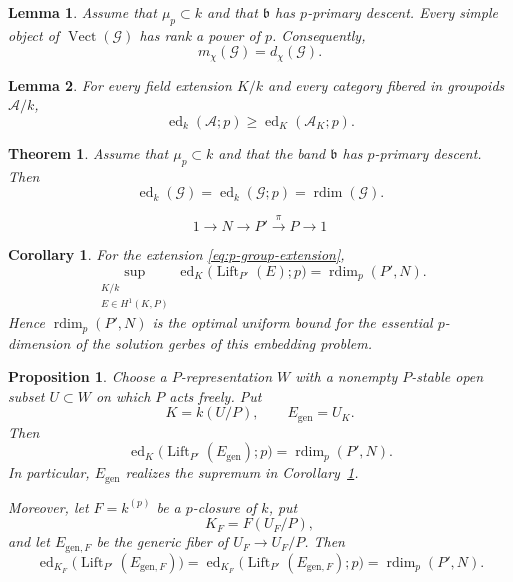 \documentclass[10pt,a4paper]{amsart}
\newtheorem{lemm}{Lemma}
\newtheorem{theo}{Theorem}
\newtheorem{coro}{Corollary}
\newtheorem{prop}{Proposition}
\def\Vect{{\operatorname{Vect}}}
\def\band{{\mathfrak b}}
\def\cA{{\mathcal A}}
\def\cG{{\mathcal G}}
\def\ed{{\operatorname{ed}}}
\def\ra{{\rightarrow}}
\def\rdim{{\operatorname{rdim}}}
\begin{document}
\begin{lemm}\label{lem:p-power-ranks-main}
Assume that $\mu_p\subset k$ and that $\band$ has $p$-primary
descent.  Every simple object of
$\Vect(\cG)$ has rank a power of $p$.  Consequently,
\begin{equation}\label{eq:block-gcd}
m_\chi(\cG)=d_\chi(\cG).
\end{equation}
\end{lemm}

\begin{lemm}\label{lem:ed-base-change}
For every field extension $K/k$ and every category fibered in groupoids
$\cA/k$,
\[
\ed_k(\cA;p)\ge\ed_K(\cA_K;p).
\]
\end{lemm}

\begin{theo}
\label{thm:gerby-km-special}
Assume that $\mu_p\subset k$ and that the band $\band$ has
$p$-primary descent.  Then
\begin{equation}\label{eq:gerby-km-special}
\ed_k(\cG)=\ed_k(\cG;p)=\rdim(\cG).
\end{equation}
\end{theo}

\begin{equation}\label{eq:p-group-extension}
1\ra N\ra P'
\xrightarrow{\pi}P\ra1
\end{equation}

\begin{coro}
\label{cor:embedding-problem}
For the extension \eqref{eq:p-group-extension},
\[
\sup_{\substack{K/k\\E\in H^1(K,P)}}
\ed_K\bigl(\operatorname{Lift}_{P'}(E);p\bigr)
=\rdim_p(P',N).
\]
Hence $\rdim_p(P',N)$ is the optimal uniform bound for the essential
$p$-dimension of the solution gerbes of this embedding problem.
\end{coro}

\begin{prop}
\label{pro:generic-embedding-problem}
Choose a $P$-representation $W$ with a nonempty $P$-stable open subset
$U\subset W$ on which $P$ acts freely.  Put
\[
K=k(U/P),
\qquad
E_{\mathrm{gen}}=U_K.
\]
Then
\begin{equation}\label{eq:generic-embedding-attainment}
\ed_K\bigl(\operatorname{Lift}_{P'}(E_{\mathrm{gen}});p\bigr)
=\rdim_p(P',N).
\end{equation}
In particular, $E_{\mathrm{gen}}$ realizes the supremum in
Corollary~\ref{cor:embedding-problem}.

Moreover, let $F=k^{(p)}$ be a $p$-closure of $k$, put
\[
K_F=F(U_F/P),
\]
and let $E_{\mathrm{gen},F}$ be the generic fiber of
$U_F\to U_F/P$.  Then
\begin{equation}\label{eq:generic-embedding-attainment-pclosure}
\ed_{K_F}\bigl(\operatorname{Lift}_{P'}(E_{\mathrm{gen},F})\bigr)
=
\ed_{K_F}\bigl(\operatorname{Lift}_{P'}(E_{\mathrm{gen},F});p\bigr)
=
\rdim_p(P',N).
\end{equation}
\end{prop}
\end{document}
